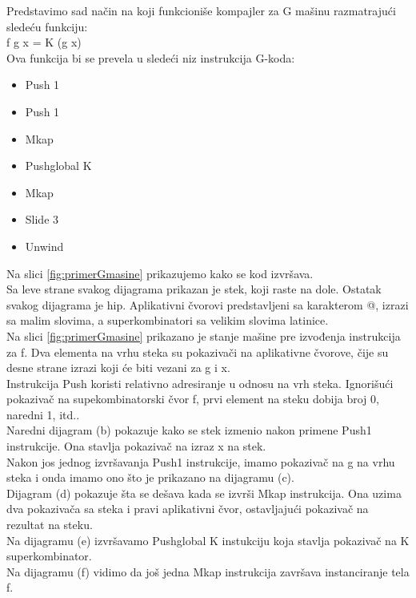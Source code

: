 \begin{primer}
Predstavimo sad način na koji funkcioniše kompajler za G mašinu razmatrajući sledeću funkciju:\\
f g x = K (g x)\\
Ova funkcija bi se prevela u sledeći niz instrukcija G-koda:
\begin{itemize}
\item Push 1
\item Push 1
\item Mkap
\item Pushglobal K
\item Mkap
\item Slide 3
\item Unwind
\end{itemize}
\end{primer}
Na slici \ref{fig:primerGmasine} prikazujemo kako se kod izvršava.\\
Sa leve strane svakog dijagrama prikazan je stek, koji raste na dole. Ostatak svakog dijagrama je hip. Aplikativni čvorovi predstavljeni sa karakterom @, izrazi sa malim slovima, a superkombinatori sa velikim slovima latinice.\\ 
Na slici \ref{fig:primerGmasine} prikazano je stanje mašine pre izvođenja instrukcija za f. Dva elementa na vrhu steka su pokazivači na aplikativne čvorove, čije su desne strane izrazi koji će biti vezani za g i x.\\ 
Instrukcija Push koristi relativno adresiranje u odnosu na vrh steka. Ignorišući pokazivač na supekombinatorski čvor f, prvi element na steku dobija broj 0, naredni 1, itd..\\ 
Naredni dijagram (b) pokazuje kako se stek izmenio nakon primene Push1 instrukcije. Ona stavlja pokazivač na izraz x na stek. \\ Nakon jos jednog izvršavanja Push1 instrukcije, imamo pokazivač na g na vrhu steka i onda imamo ono što je prikazano na dijagramu (c). \\ Dijagram (d) pokazuje šta se dešava kada se izvrši Mkap instrukcija. Ona uzima dva pokazivača sa steka i pravi aplikativni čvor, ostavljajući pokazivač na rezultat na steku. \\ Na dijagramu (e) izvršavamo Pushglobal K instukciju koja stavlja pokazivač na K superkombinator. \\ Na dijagramu (f) vidimo da još jedna Mkap instrukcija završava instanciranje tela f.\\ 
